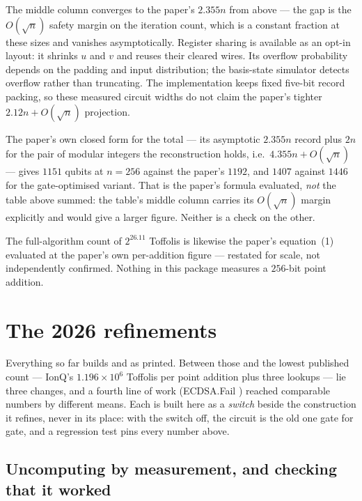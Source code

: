 \documentclass[11pt]{article}
\theoremstyle{plain}
\theoremstyle{remark}
\begin{document}
\noindent
The middle column converges to the paper's $2.355n$ from above --- the gap is the $O(\sqrt n)$
safety margin on the iteration count, which is a constant fraction at these sizes and vanishes
asymptotically. Register sharing is available as an opt-in layout: it shrinks $u$ and $v$ and reuses
their cleared wires. Its overflow probability depends on the padding and input distribution; the
basis-state simulator detects overflow rather than truncating. The implementation keeps fixed
five-bit record packing, so these measured circuit widths do not claim the paper's tighter
$2.12n+O(\sqrt n)$ projection.

The paper's own closed form for the total --- its asymptotic $2.355n$ record plus $2n$ for the pair
of modular integers the reconstruction holds, i.e.\ $4.355n+O(\sqrt n)$ --- gives
$1151$ qubits at $n=256$ against the paper's $1192$, and $1407$ against $1446$
for the gate-optimised variant. That is the paper's formula evaluated, \emph{not} the table above
summed: the table's middle column carries its $O(\sqrt n)$ margin explicitly and would give a
larger figure. Neither is a check on the other.

The full-algorithm count of $2^{26.11}$ Toffolis is likewise the paper's equation~(1)
evaluated at the paper's own per-addition figure --- restated for scale, not independently
confirmed. Nothing in this package measures a $256$-bit point addition.

\section{The 2026 refinements}\label{ec:sec:refine}

Everything so far builds \cite{ec:kim26} and \cite{ec:schrott26} as printed. Between those and the
lowest published count --- IonQ's $1.196\times10^{6}$ Toffolis per point addition plus three
lookups \cite{ec:ionq26} --- lie three changes, and a fourth line of work (ECDSA.Fail
\cite{ec:ecdsafail26}) reached comparable numbers by different means. Each is built here as a
\emph{switch} beside the construction it refines, never in its place: with the switch off, the
circuit is the old one gate for gate, and a regression test pins every number above.

\subsection{Uncomputing by measurement, and checking that it worked}
\end{document}
